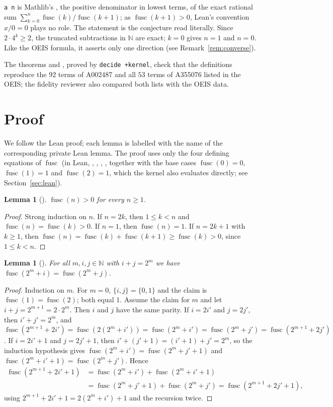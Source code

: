 \documentclass[11pt]{amsart}
\theoremstyle{plain}
\newtheorem{lemma}[theorem]{Lemma}
\theoremstyle{definition}
\newcommand{\N}{\mathbb{N}}
\DeclareMathOperator{\fusc}{fusc}
\begin{document}
\texttt{a n} is Mathlib's , the positive denominator in lowest terms, of the exact rational sum $\sum_{k=0}^{n}\fusc(k)/\fusc(k+1)$; as $\fusc(k+1)>0$, Lean's convention $x/0=0$ plays no role. The statement is the conjecture read literally. Since $2\cdot4^k\ge2$, the truncated subtractions in $\N$ are exact; $k=0$ gives $n=1$ and $n=0$. Like the OEIS formula, it asserts only one direction (see Remark~\ref{rem:converse}).

The theorems  and , proved by \texttt{decide +kernel}, check that the definitions reproduce the $92$ terms of A002487 and all $53$ terms of A355076 listed in the OEIS; the fidelity reviewer also compared both lists with the OEIS data.

\section{Proof}\label{sec:proof}

We follow the Lean proof; each lemma is labelled with the name of the corresponding private Lean lemma. The proof uses only the four defining equations of $\fusc$ (in Lean, , , , , together with the base cases $\fusc(0)=0$, $\fusc(1)=1$ and $\fusc(2)=1$, which the kernel also evaluates directly; see Section~\ref{sec:lean}).

\begin{lemma}[]\label{lem:pos}
$\fusc(n)>0$ for every $n\ge1$.
\end{lemma}

\begin{proof}
Strong induction on $n$. If $n=2k$, then $1\le k<n$ and $\fusc(n)=\fusc(k)>0$. If $n=1$, then $\fusc(n)=1$. If $n=2k+1$ with $k\ge1$, then $\fusc(n)=\fusc(k)+\fusc(k+1)\ge\fusc(k)>0$, since $1\le k<n$.
\end{proof}

\begin{lemma}[]\label{lem:symm}
For all $m,i,j\in\N$ with $i+j=2^m$ we have $\fusc(2^m+i)=\fusc(2^m+j)$.
\end{lemma}

\begin{proof}
Induction on $m$. For $m=0$, $\{i,j\}=\{0,1\}$ and the claim is $\fusc(1)=\fusc(2)$; both equal $1$.
Assume the claim for $m$ and let $i+j=2^{m+1}=2\cdot2^m$. Then $i$ and $j$ have the same parity. If $i=2i'$ and $j=2j'$, then $i'+j'=2^m$, and $\fusc(2^{m+1}+2i')=\fusc(2(2^m+i'))=\fusc(2^m+i')=\fusc(2^m+j')=\fusc(2^{m+1}+2j')$.
If $i=2i'+1$ and $j=2j'+1$, then $i'+(j'+1)=(i'+1)+j'=2^m$, so the induction hypothesis gives $\fusc(2^m+i')=\fusc(2^m+j'+1)$ and $\fusc(2^m+i'+1)=\fusc(2^m+j')$. Hence
\begin{align*}
  \fusc(2^{m+1}+2i'+1)&=\fusc(2^m+i')+\fusc(2^m+i'+1)\\
  &=\fusc(2^m+j'+1)+\fusc(2^m+j')=\fusc(2^{m+1}+2j'+1),
\end{align*}
using $2^{m+1}+2i'+1=2(2^m+i')+1$ and the recursion twice.
\end{proof}
\end{document}
